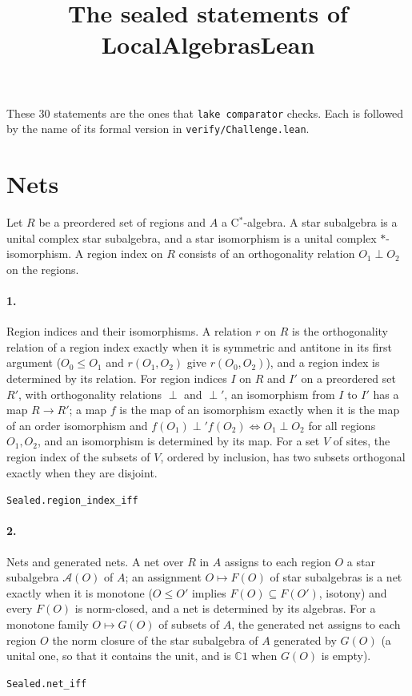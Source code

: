\documentclass[11pt]{article}
\title{The sealed statements of LocalAlgebrasLean}\date{}
\begin{document}
\maketitle
These 30 statements are the ones that \texttt{lake comparator} checks. Each is followed by the name of its formal version in \texttt{verify/Challenge.lean}.

\section*{Nets}
Let $R$ be a preordered set of regions and $A$ a C$^*$-algebra. A star subalgebra is a unital complex star subalgebra, and a star isomorphism is a unital complex $*$-isomorphism. A region index on $R$ consists of an orthogonality relation $O_1 \perp O_2$ on the regions.

\paragraph{1.} Region indices and their isomorphisms. A relation $r$ on $R$ is the orthogonality relation of a region index exactly when it is symmetric and antitone in its first argument ($O_0 \le O_1$ and $r(O_1, O_2)$ give $r(O_0, O_2)$), and a region index is determined by its relation. For region indices $I$ on $R$ and $I'$ on a preordered set $R'$, with orthogonality relations $\perp$ and $\perp'$, an isomorphism from $I$ to $I'$ has a map $R \to R'$; a map $f$ is the map of an isomorphism exactly when it is the map of an order isomorphism and $f(O_1) \perp' f(O_2) \iff O_1 \perp O_2$ for all regions $O_1, O_2$, and an isomorphism is determined by its map. For a set $V$ of sites, the region index of the subsets of $V$, ordered by inclusion, has two subsets orthogonal exactly when they are disjoint.\par{\footnotesize\texttt{Sealed.region\_index\_iff}}

\paragraph{2.} Nets and generated nets. A net over $R$ in $A$ assigns to each region $O$ a star subalgebra $\mathcal A(O)$ of $A$; an assignment $O \mapsto F(O)$ of star subalgebras is a net exactly when it is monotone ($O \le O'$ implies $F(O) \subseteq F(O')$, isotony) and every $F(O)$ is norm-closed, and a net is determined by its algebras. For a monotone family $O \mapsto G(O)$ of subsets of $A$, the generated net assigns to each region $O$ the norm closure of the star subalgebra of $A$ generated by $G(O)$ (a unital one, so that it contains the unit, and is $\mathbb C 1$ when $G(O)$ is empty).\par{\footnotesize\texttt{Sealed.net\_iff}}
\end{document}
